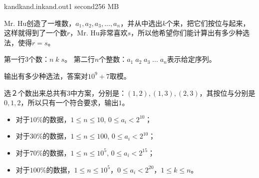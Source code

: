 \documentclass[11pt,a4paper,oneside]{article}
\begin{document}
\begin{problem}{kand}{kand.in}{kand.out}{1 second}{256 MB}
    
	Mr. Hu创造了一堆数，$a_1,a_2,a_3,...,a_n$，并从中选出$k$个来，把它们按位与起来，这样就得到了一个数$r$，Mr. Hu非常喜欢$s$，所以他希望你们能计算出有多少种选法，使得$r = s$。

    \InputFile

	第一行$3$个数：$n \; k \; s$。
	第二行$n$个整数：$a_1 \; a_2 \; a_3 \;...\; a_n$表示给定序列。 

    \OutputFile

	输出有多少种选法，答案对$10^9 + 7$取模。

    \Example

    \begin{example}
    \end{example}
	
	选２个数出来总共有$3$中方案，分别是：$(1,2),(1,3),(2,3)$，其按位与分别是$0,1,2$，所以只有一个符合要求，输出$1$。
	
    \Note
    
    \begin{itemize}
    	\item 对于$10\%$的数据，$1 \leq n \leq 10$, $0 \leq a_i < 2^{10}$；
        \item 对于$30\%$的数据，$1 \leq n \leq 100$, $0 \leq a_i < 2^{10}$；
        \item 对于$70\%$的数据，$1 \leq n \leq 10^5$, $0 \leq a_i < 2^{15}$；
        \item 对于$100\%$的数据，$1 \leq n \leq 10^5$，$0 \leq a_i < 2^{20}$，$1 \leq k \leq n$。
    \end{itemize}

\end{problem}
\end{document}
